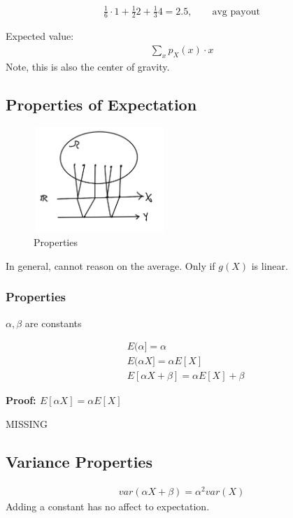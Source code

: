 \documentclass{article}
\begin{document}
\begin{align*}
\frac{1}{6}\cdot 1 + \frac{1}{2}2 + \frac{1}{3}4 = 2.5, \qquad \text{avg payout}
\end{align*}

Expected value:
\begin{align*}
\sum_x p_X(x) \cdot x
\end{align*}
Note, this is also the center of gravity.

\subsection{Properties of Expectation}


\begin{figure}[h]
\centering
\includegraphics[width=5cm, height=4cm]{images/L05/EX_properties.jpeg}
\caption{Properties}
\end{figure}

 In general, cannot reason on the average.  Only if $g(X)$ is linear.


\subsubsection{Properties}
$\alpha, \beta$ are constants

\begin{align*}
&E(\alpha] = \alpha\\
&E(\alpha X] = \alpha E[X]\\
&E[\alpha X + \beta] = \alpha E[X] + \beta
\end{align*}

\textbf{Proof: $E[\alpha X]= \alpha E[X]$}

MISSING

\subsection{Variance Properties}


\begin{align*}
var(\alpha X + \beta) = \alpha^2 var(X)
\end{align*}
Adding a constant has no affect to expectation.
\end{document}
